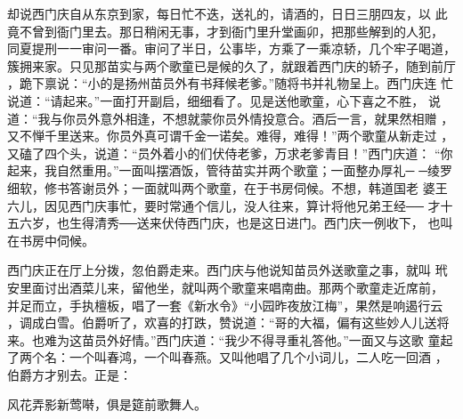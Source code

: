 却说西门庆自从东京到家，每日忙不迭，送礼的，请酒的，日日三朋四友，以
此竟不曾到衙门里去。那日稍闲无事，才到衙门里升堂画卯，把那些解到的人犯，
同夏提刑一一审问一番。审问了半日，公事毕，方乘了一乘凉轿，几个牢子喝道，
簇拥来家。只见那苗实与两个歌童已是候的久了，就跟着西门庆的轿子，随到前厅
，跪下禀说：“小的是扬州苗员外有书拜候老爹。”随将书并礼物呈上。西门庆连
忙说道：“请起来。”一面打开副启，细细看了。见是送他歌童，心下喜之不胜，
说道：“我与你员外意外相逢，不想就蒙你员外情投意合。酒后一言，就果然相赠
，又不惮千里送来。你员外真可谓千金一诺矣。难得，难得！”两个歌童从新走过
，又磕了四个头，说道：“员外着小的们伏侍老爹，万求老爹青目！”西门庆道：
“你起来，我自然重用。”一面叫摆酒饭，管待苗实并两个歌童；一面整办厚礼─
─绫罗细软，修书答谢员外；一面就叫两个歌童，在于书房伺候。不想，韩道国老
婆王六儿，因见西门庆事忙，要时常通个信儿，没人往来，算计将他兄弟王经──
才十五六岁，也生得清秀──送来伏侍西门庆，也是这日进门。西门庆一例收下，
也叫在书房中伺候。

西门庆正在厅上分拨，忽伯爵走来。西门庆与他说知苗员外送歌童之事，就叫
玳安里面讨出酒菜儿来，留他坐，就叫两个歌童来唱南曲。那两个歌童走近席前，
并足而立，手执檀板，唱了一套《新水令》“小园昨夜放江梅”，果然是响遏行云
，调成白雪。伯爵听了，欢喜的打跌，赞说道：“哥的大福，偏有这些妙人儿送将
来。也难为这苗员外好情。”西门庆道：“我少不得寻重礼答他。”一面又与这歌
童起了两个名：一个叫春鸿，一个叫春燕。又叫他唱了几个小词儿，二人吃一回酒
，伯爵方才别去。正是：

风花弄影新莺啭，俱是筵前歌舞人。